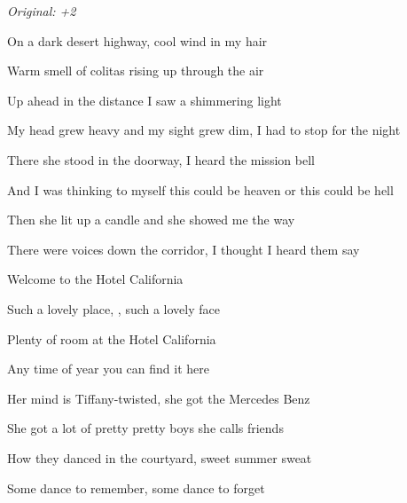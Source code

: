 \begin{song}


\begin{headerbox}
 \quad
\textit{Original: +2}
\end{headerbox}

\begin{hchordbox}
\end{hchordbox}

\large

\bigskip

 On a dark desert highway,  cool wind in my hair \par
{} Warm smell of colitas  rising up through the air \par
{} Up ahead in the distance  I saw a shimmering light \par
{} My head grew heavy and my sight grew dim,  I had to stop for the night \par

\bigskip

 There she stood in the doorway,  I heard the mission bell \par
{} And I was thinking to myself this could be heaven or this could be hell \par
{} Then she lit up a candle  and she showed me the way \par
{} There were voices down the corridor,  I thought I heard them say \par

\bigskip

 Welcome to the Hotel California \par
Such a lovely place, , such a lovely face \par
{}Plenty of room at the Hotel California \par
Any time of year  you can find it here \par

\bigskip

 Her mind is Tiffany-twisted,  she got the Mercedes Benz \par
{} She got a lot of pretty pretty boys  she calls friends \par
{} How they danced in the courtyard, sweet summer sweat \par
{} Some dance to remember,  some dance to forget \par


\end{song}
